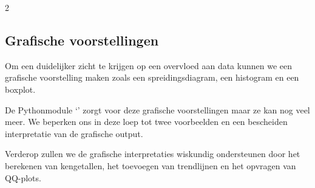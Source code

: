 \begin{multicols}{2}

\subsection{Grafische voorstellingen}
Om een duidelijker zicht te krijgen op een overvloed aan data kunnen we een grafische voorstelling maken zoals een spreidingsdiagram, een histogram en een boxplot.

De Pythonmodule `' zorgt voor deze grafische voorstellingen maar ze kan nog veel meer. We beperken ons in deze loep tot twee voorbeelden en een bescheiden interpretatie van de grafische output. 

Verderop zullen we de grafische interpretaties wiskundig ondersteunen door het berekenen van kengetallen, het toevoegen van trendlijnen en het opvragen van QQ-plots.

\end{multicols}
